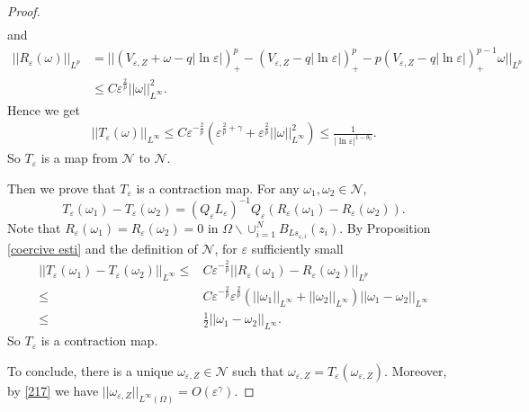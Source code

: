 \documentclass[12pt,reqno]{amsart}
\numberwithin{equation}{section}
\theoremstyle{definition}
\theoremstyle{remark}
\begin{document}
\begin{proof}
\begin{equation*}
\begin{split}
\end{split}
\end{equation*}
and
\begin{equation*}
\begin{split}
||R_\varepsilon(\omega)||_{L^p}&=||\left (V_{\varepsilon,Z}+\omega-q|\ln\varepsilon|\right )^p_+-\left (V_{\varepsilon,Z}-q|\ln\varepsilon|\right )^p_+-p\left (V_{\varepsilon,Z}-q|\ln\varepsilon|\right )^{p-1}_+\omega||_{L^p}\\
&\leq C\varepsilon^{\frac{2}{p}}||\omega||_{L^\infty}^2.
\end{split}
\end{equation*}
Hence we get
\begin{equation}\label{217}
\begin{split}
||T_\varepsilon(\omega)||_{L^\infty}\leq C\varepsilon^{-\frac{2}{p}}\left( \varepsilon^{\frac{2}{p}+\gamma}+\varepsilon^{\frac{2}{p}}||\omega||_{L^\infty}^2\right)
\leq \frac{1}{|\ln\varepsilon|^{1-\theta_0}}.
\end{split}
\end{equation}
So $ T_\varepsilon $ is a map from $ \mathcal{N}$ to $ \mathcal{N} $.

Then we prove that  $ T_\varepsilon $ is a contraction map. For any $ \omega_1,\omega_2\in \mathcal{N} $,
\begin{equation*}
T_\varepsilon(\omega_1)-T_\varepsilon(\omega_2)=(Q_\varepsilon L_\varepsilon)^{-1}Q_\varepsilon(R_\varepsilon(\omega_1)-R_\varepsilon(\omega_2)).
\end{equation*}
Note that $ R_\varepsilon(\omega_1)=R_\varepsilon(\omega_2)=0 $ in $ \Omega \backslash\cup_{i=1}^NB_{Ls_{\varepsilon,i}}(z_{i}). $ By Proposition \ref{coercive esti} and the definition of $ \mathcal{N} $, for $ \varepsilon $ sufficiently small
\begin{equation*}
\begin{split}
||T_\varepsilon(\omega_1)-T_\varepsilon(\omega_2)||_{L^\infty}\leq &C\varepsilon^{-\frac{2}{p}}||R_\varepsilon(\omega_1)-R_\varepsilon(\omega_2)||_{L^p}\\
\leq &C\varepsilon^{-\frac{2}{p}}\varepsilon^{\frac{2}{p}}\left(||\omega_1||_{L^\infty}+||\omega_2||_{L^\infty} \right) ||\omega_1-\omega_2||_{L^\infty}\\
\leq& \frac{1}{2}||\omega_1-\omega_2||_{L^\infty}.
\end{split}
\end{equation*}
So $ T_\varepsilon $ is a contraction map.

To conclude,  %
there is a unique $ \omega_{\varepsilon,Z}\in \mathcal{N} $ such that $ \omega_{\varepsilon,Z}=T_\varepsilon(\omega_{\varepsilon,Z}) $. Moreover, by \eqref{217}  we have $ ||\omega_{\varepsilon,Z}||_{L^\infty(\Omega)}=O\left( \varepsilon^\gamma\right).  $


\end{proof}
\end{document}
